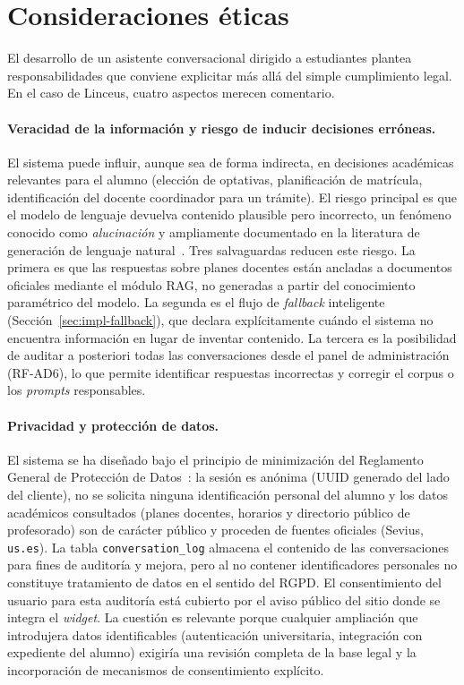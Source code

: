 \section{Consideraciones éticas}\label{sec:conc-etica}

El desarrollo de un asistente conversacional dirigido a estudiantes plantea responsabilidades que conviene explicitar más allá del simple cumplimiento legal. En el caso de Linceus, cuatro aspectos merecen comentario.

\paragraph{Veracidad de la información y riesgo de inducir decisiones erróneas.} El sistema puede influir, aunque sea de forma indirecta, en decisiones académicas relevantes para el alumno (elección de optativas, planificación de matrícula, identificación del docente coordinador para un trámite). El riesgo principal es que el modelo de lenguaje devuelva contenido plausible pero incorrecto, un fenómeno conocido como \textit{alucinación} y ampliamente documentado en la literatura de generación de lenguaje natural~\cite{ji2023survey}. Tres salvaguardas reducen este riesgo. La primera es que las respuestas sobre planes docentes están ancladas a documentos oficiales mediante el módulo RAG, no generadas a partir del conocimiento paramétrico del modelo. La segunda es el flujo de \textit{fallback} inteligente (Sección~\ref{sec:impl-fallback}), que declara explícitamente cuándo el sistema no encuentra información en lugar de inventar contenido. La tercera es la posibilidad de auditar a posteriori todas las conversaciones desde el panel de administración (RF-AD6), lo que permite identificar respuestas incorrectas y corregir el corpus o los \textit{prompts} responsables.

\paragraph{Privacidad y protección de datos.} El sistema se ha diseñado bajo el principio de minimización del Reglamento General de Protección de Datos~\cite{rgpd2016}: la sesión es anónima (UUID generado del lado del cliente), no se solicita ninguna identificación personal del alumno y los datos académicos consultados (planes docentes, horarios y directorio público de profesorado) son de carácter público y proceden de fuentes oficiales (Sevius, \texttt{us.es}). La tabla \texttt{conversation\_log} almacena el contenido de las conversaciones para fines de auditoría y mejora, pero al no contener identificadores personales no constituye tratamiento de datos en el sentido del RGPD. El consentimiento del usuario para esta auditoría está cubierto por el aviso público del sitio donde se integra el \textit{widget}. La cuestión es relevante porque cualquier ampliación que introdujera datos identificables (autenticación universitaria, integración con expediente del alumno) exigiría una revisión completa de la base legal y la incorporación de mecanismos de consentimiento explícito.

